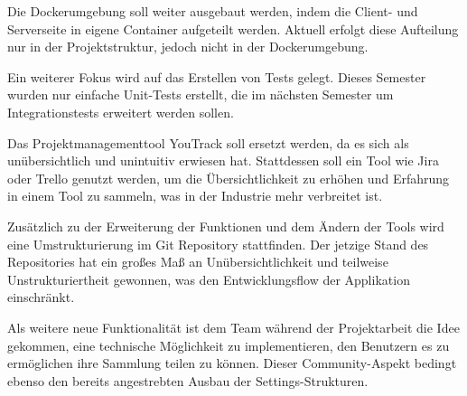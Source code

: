 Die Dockerumgebung soll weiter ausgebaut werden, indem die Client- und Serverseite in eigene Container aufgeteilt werden.
Aktuell erfolgt diese Aufteilung nur in der Projektstruktur, jedoch nicht in der Dockerumgebung.

Ein weiterer Fokus wird auf das Erstellen von Tests gelegt.
Dieses Semester wurden nur einfache Unit-Tests erstellt, die im nächsten Semester um Integrationstests erweitert werden sollen.

Das Projektmanagementtool YouTrack soll ersetzt werden, da es sich als unübersichtlich und unintuitiv erwiesen hat.
Stattdessen soll ein Tool wie Jira oder Trello genutzt werden, um die Übersichtlichkeit zu erhöhen und Erfahrung in einem Tool zu sammeln, was in der Industrie mehr verbreitet ist.

Zusätzlich zu der Erweiterung der Funktionen und dem Ändern der Tools wird eine Umstrukturierung im Git Repository stattfinden.
Der jetzige Stand des Repositories hat ein großes Maß an Unübersichtlichkeit und teilweise Unstrukturiertheit gewonnen, was den Entwicklungsflow der Applikation einschränkt.

Als weitere neue Funktionalität ist dem Team während der Projektarbeit die Idee gekommen, eine technische Möglichkeit zu implementieren, den Benutzern es zu ermöglichen ihre Sammlung teilen zu können.
Dieser Community-Aspekt bedingt ebenso den bereits angestrebten Ausbau der Settings-Strukturen.
